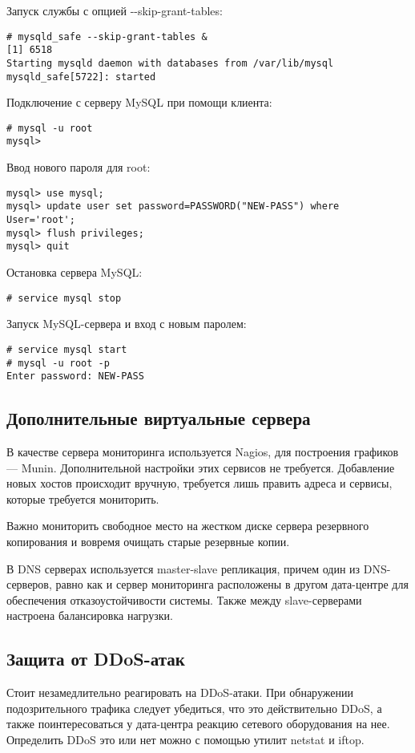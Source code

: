 Запуск службы с опцией -{}-skip-grant-tables:
\begin{lstlisting}
# mysqld_safe --skip-grant-tables &
[1] 6518
Starting mysqld daemon with databases from /var/lib/mysql
mysqld_safe[5722]: started
\end{lstlisting}

Подключение с серверу MySQL при помощи клиента:
\begin{lstlisting}
# mysql -u root
mysql>
\end{lstlisting}

Ввод нового пароля для root:
\begin{lstlisting}
mysql> use mysql;
mysql> update user set password=PASSWORD("NEW-PASS") where User='root';
mysql> flush privileges;
mysql> quit
\end{lstlisting}

Остановка сервера MySQL:
\begin{lstlisting}
# service mysql stop
\end{lstlisting}

Запуск MySQL-сервера и вход с новым паролем:
\begin{lstlisting}
# service mysql start
# mysql -u root -p
Enter password: NEW-PASS
\end{lstlisting}

\subsection{Дополнительные виртуальные сервера}

В качестве сервера мониторинга используется Nagios, для построения графиков --- Munin.
Дополнительной настройки этих сервисов не требуется.
Добавление новых хостов происходит вручную, требуется лишь править адреса и сервисы, которые требуется мониторить.

Важно мониторить свободное место на жестком диске сервера резервного копирования и вовремя очищать старые резервные копии.

В DNS серверах используется master-slave репликация, причем один из DNS-серверов, равно как и сервер мониторинга расположены в другом дата-центре для обеспечения отказоустойчивости системы.
Также между slave-серверами настроена балансировка нагрузки.

\subsection{Защита от DDoS-атак}

Стоит незамедлительно реагировать на DDoS-атаки.
При обнаружении подозрительного трафика следует убедиться, что это действительно DDoS, а также поинтересоваться у дата-центра реакцию сетевого оборудования на нее.
Определить DDoS это или нет можно с помощью утилит netstat и iftop.

